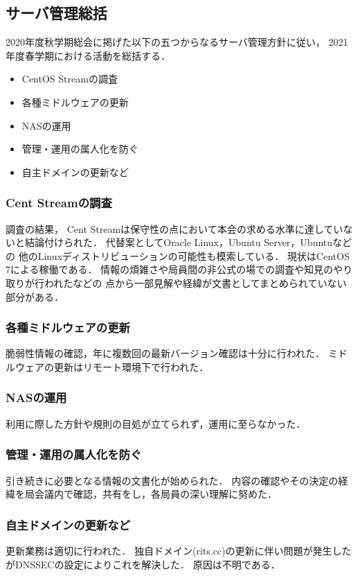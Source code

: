 \subsection*{サーバ管理総括}


2020年度秋学期総会に掲げた以下の五つからなるサーバ管理方針に従い，
2021年度春学期における活動を総括する．
\begin{itemize}
    \item CentOS Streamの調査
    \item 各種ミドルウェアの更新
    \item NASの運用
    \item 管理・運用の属人化を防ぐ
    \item 自主ドメインの更新など
\end{itemize}

\subsubsection*{Cent Streamの調査}
調査の結果，
Cent Streamは保守性の点において本会の求める水準に達していないと結論付けられた．
代替案としてOracle Linux，Ubuntu Server，Ubuntuなどの
他のLinuxディストリビューションの可能性も模索している．
現状はCentOS 7による稼働である．
情報の煩雑さや局員間の非公式の場での調査や知見のやり取りが行われたなどの
点から一部見解や経緯が文書としてまとめられていない部分がある．

\subsubsection*{各種ミドルウェアの更新}
脆弱性情報の確認，年に複数回の最新バージョン確認は十分に行われた．
ミドルウェアの更新はリモート環境下で行われた．

\subsubsection*{NASの運用}
利用に際した方針や規則の目処が立てられず，運用に至らなかった．

\subsubsection*{管理・運用の属人化を防ぐ}
引き続きに必要となる情報の文書化が始められた．
内容の確認やその決定の経緯を局会議内で確認，共有をし，各局員の深い理解に努めた．

\subsubsection*{自主ドメインの更新など}
更新業務は適切に行われた．
独自ドメイン(rits.cc)の更新に伴い問題が発生したがDNSSECの設定によりこれを解決した．
原因は不明である．
